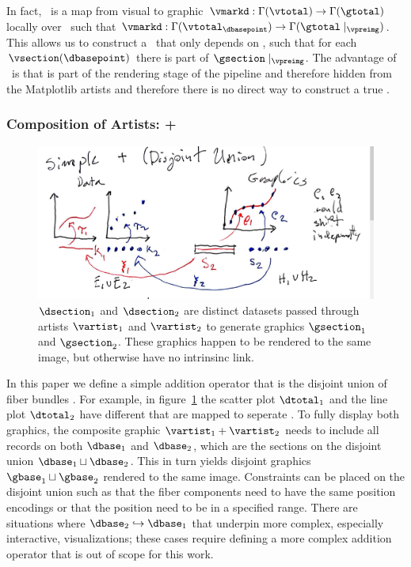 \documentclass[../main.tex]{subfiles}
\begin{document}
In fact, \vmarkd\ is a map from visual to graphic $\vmarkd:\Gamma(\vtotal) \rightarrow \Gamma(\gtotal)$ locally over \dbasepoint\ such that $\vmarkd:\Gamma(\vtotal_{\dbasepoint}) \rightarrow \Gamma(\gtotal\mid_{\vpreimg})$. This allows us to construct a \vmarkd\ that only depends on \dbase, such that for each $\vsection(\dbasepoint)$ there is part of $\gsection\mid_{\vpreimg}$. The advantage of \vmarkd\ is that \gbase is part of the rendering stage of the pipeline and therefore hidden from the Matplotlib artists and therefore there is no direct way to construct a true \vmark. 

\subsubsection{Composition of Artists: +}
\begin{figure}
    \includegraphics[width=1\textwidth]{figures/math/addition_operator.png}
    \caption{$\dsection_1$ and $\dsection_2$ are distinct datasets passed through artists $\vartist_1$ and $\vartist_2$ to generate graphics $\gsection_1$ and $\gsection_2$. These graphics happen to be rendered to the same image, but otherwise have no intrinsinc link.}
    \label{fig:artist_plus}
\end{figure}
In this paper we define a simple addition operator that is the disjoint union of fiber bundles \dtotal.  For example, in figure~\ref{fig:artist_plus} the scatter plot $\dtotal_1$ and the line plot $\dtotal_2$ have different \dbase that are mapped to seperate \gbase. To fully display both graphics, the composite graphic $\vartist_1 + \vartist_2$ needs to include all records on both $\dbase_1$ and $\dbase_2$, which are the sections on the disjoint union $\dbase_1 \sqcup \dbase_2$. This in turn yields disjoint graphics $\gbase_1 \sqcup \gbase_2$ rendered to the same image. Constraints can be placed on the disjoint union such as that the fiber components need to have the same \vchannel position encodings or that the position \vsection need to be in a specified range. There are situations where $\dbase_2 \hookrightarrow \dbase_1$ that underpin more complex, especially interactive, visualizations; these cases require defining a more complex addition operator that is out of scope for this work. 
\end{document}
